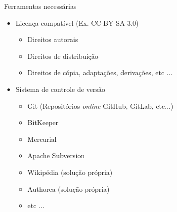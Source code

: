 \documentclass{beamer}
\begin{document}
\begin{frame}{Ferramentas necessárias}
  \begin{itemize}
  \item Licença compatível (Ex. CC-BY-SA 3.0)
    \begin{itemize}
    \item Direitos autorais
    \item Direitos de distribuição
    \item Direitos de cópia, adaptações, derivações, etc ...
    \end{itemize}
  \item Sistema de controle de versão
    \begin{itemize}
    \item Git (Repositórios {\it online} GitHub, GitLab, etc...)
    \item BitKeeper
    \item Mercurial
    \item Apache Subversion
    \item Wikipédia (solução própria)
    \item Authorea (solução própria)
    \item etc ...
    \end{itemize}
  \end{itemize}
\end{frame}
\end{document}
